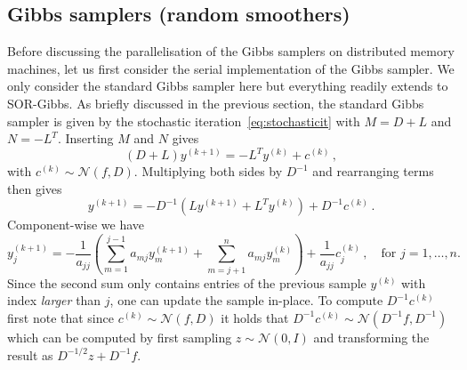 \documentclass[
fontsize=11pt,
paper=a4,
numbers=noenddot
]{scrartcl}
\begin{document}
\subsection{Gibbs samplers (random smoothers)}
Before discussing the parallelisation of the Gibbs samplers on distributed memory machines, let us first consider the serial implementation of the Gibbs sampler. We only consider the standard Gibbs sampler here but everything readily extends to SOR-Gibbs. As briefly discussed in the previous section, the standard Gibbs sampler is given by the stochastic iteration~\eqref{eq:stochasticit} with $M = D + L$ and $N = -L^T$. Inserting $M$ and $N$ gives
\begin{equation*}
    \left(D + L\right) y^{(k+1)} = - L^T y^{(k)} + c^{(k)}\,,
\end{equation*}
with $c^{(k)} \sim \mathcal{N}(f,D)$. Multiplying both sides by $D^{-1}$ and rearranging terms then gives
\begin{equation*}
    y^{(k+1)} = - D^{-1} (L y^{(k+1)} + L^T y^{(k)}) + D^{-1} c^{(k)}\,.
\end{equation*}
Component-wise we have
\begin{equation}
    \label{eq:gibbs_comp}
    y^{(k+1)}_j = - \frac{1}{a_{jj}} \left(
        \sum_{m=1}^{j-1} a_{mj} y^{(k+1)}_m + \sum_{m=j+1}^n a_{mj} y^{(k)}_m
    \right) + \frac{1}{a_{jj}} c^{(k)}_j \,,\quad \text{for $j=1,\dotsc,n$.}
\end{equation}
Since the second sum only contains entries of the previous sample $y^{(k)}$ with index \emph{larger} than $j$, one can update the sample in-place. To compute $D^{-1} c^{(k)}$ first note that since $c^{(k)} \sim \mathcal{N}(f, D)$ it holds that $D^{-1} c^{(k)} \sim \mathcal{N}(D^{-1}f, D^{-1})$ which can be computed by first sampling $z \sim \mathcal{N}(0, I)$ and transforming the result as $D^{-1/2}z + D^{-1}f$.
\end{document}
